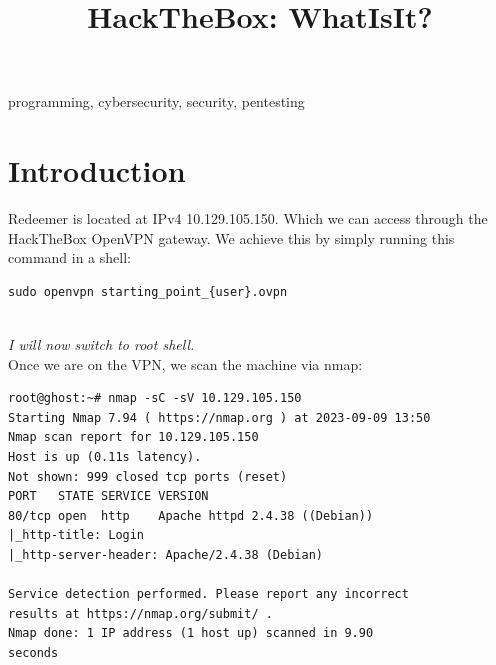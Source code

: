 \documentclass[conference]{IEEEtran}
\begin{document}
\onecolumn


\title{HackTheBox: WhatIsIt?}

\author{
}

\maketitle



\begin{abstract}

\end{abstract}



\begin{IEEEkeywords}
programming, cybersecurity, security, pentesting
\end{IEEEkeywords}


\section{Introduction}
Redeemer is located at IPv4 10.129.105.150. Which we can access through the HackTheBox OpenVPN gateway.
We achieve this by simply running this command in a shell:
\begin{scriptsize}
\begin{verbatim}
sudo openvpn starting_point_{user}.ovpn
\end{verbatim}
\end{scriptsize}

\\
\textit{I will now switch to root shell.}
\\

Once we are on the VPN, we scan the machine via nmap:
\begin{scriptsize}
\begin{verbatim}
root@ghost:~# nmap -sC -sV 10.129.105.150
Starting Nmap 7.94 ( https://nmap.org ) at 2023-09-09 13:50
Nmap scan report for 10.129.105.150
Host is up (0.11s latency).
Not shown: 999 closed tcp ports (reset)
PORT   STATE SERVICE VERSION
80/tcp open  http    Apache httpd 2.4.38 ((Debian))
|_http-title: Login
|_http-server-header: Apache/2.4.38 (Debian)

Service detection performed. Please report any incorrect
results at https://nmap.org/submit/ .
Nmap done: 1 IP address (1 host up) scanned in 9.90
seconds

\end{verbatim}
\end{scriptsize}
\end{document}

